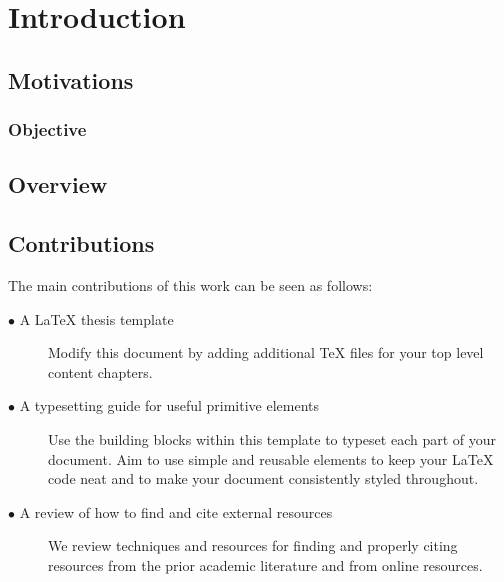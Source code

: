 \chapter{Introduction}
	\label{chap:intro}



	\section{Motivations}
		\label{sec:intro_motivation} 



	\subsection{Objective}
		\label{sec:intro_objective} 



	\section{Overview}  
		\label{sec:intro_overview} 



	\section{Contributions} 
		\label{sec:intro_contribs} 

The main contributions of this work can be seen as follows:

		\begin{description}	

			\item[\(\bullet\) A \LaTeX{} thesis template]\hfill

Modify this document by adding additional \TeX{} files for your top level content chapters. 

			\item[\(\bullet\) A typesetting guide for useful primitive elements]\hfill

Use the building blocks within this template to typeset each part of your document.
Aim to use simple and reusable elements to keep your \LaTeX{} code neat and to make your document consistently styled throughout.

			\item[\(\bullet\) A review of how to find and cite external resources]\hfill

We review techniques and resources for finding and properly citing resources from the prior academic literature and from online resources.

		\end{description}
